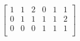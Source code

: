 \documentclass{article}
\begin{document}
 $
\left[
\begin{array}{c|c|c|c|c|c}
1 & 1 & 2 & 0 & 1 & 1 \\
0 & 1 & 1 & 1 & 1 & 2 \\
0 & 0 & 0 & 1 & 1 & 1 \\
\end{array}
\right] $
\end{document}
